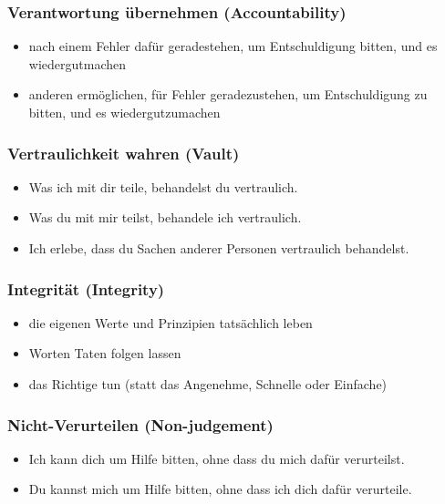 \subsubsection{Verantwortung übernehmen (Accountability)}

\begin{itemize}
    \item nach einem Fehler dafür geradestehen, um Entschuldigung bitten, und es wiedergutmachen
    \item anderen ermöglichen, für Fehler geradezustehen, um Entschuldigung zu bitten, und es wiedergutzumachen
\end{itemize}

\subsubsection{Vertraulichkeit wahren (Vault)}

\begin{itemize}
    \item \glqq Was ich mit dir teile, behandelst du vertraulich.\grqq
    \item \glqq Was du mit mir teilst, behandele ich vertraulich.\grqq
    \item \glqq Ich erlebe, dass du Sachen anderer Personen vertraulich behandelst.\grqq
\end{itemize}

\subsubsection{Integrität (Integrity)}

\begin{itemize}
    \item die eigenen Werte und Prinzipien tatsächlich leben
    \item Worten Taten folgen lassen
    \item das Richtige tun (statt das Angenehme, Schnelle oder Einfache)
\end{itemize}

\subsubsection{Nicht-Verurteilen (Non-judgement)}

\begin{itemize}
    \item \glqq Ich kann dich um Hilfe bitten, ohne dass du mich dafür verurteilst.\grqq
    \item \glqq Du kannst mich um Hilfe bitten, ohne dass ich dich dafür verurteile.\grqq
\end{itemize}

